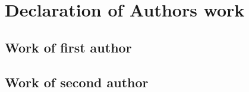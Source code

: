 \onecolumn

\section*{Declaration of Authors work}
\label{sec:declare-work}

\subsection*{Work of first author}

\lipsum[4-8]

\subsection*{Work of second author}

\lipsum[8-12]

\twocolumn
